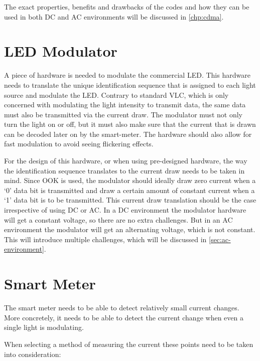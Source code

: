 	The exact properties, benefits and drawbacks of the codes and how they can be used in both DC and AC environments will be discussed in \autoref{chp:cdma}.




	\section{LED Modulator}

	A piece of hardware is needed to modulate the commercial LED.
	This hardware needs to translate the unique identification sequence that is assigned to each light source and modulate the LED.
	Contrary to standard VLC, which is only concerned with modulating the light intensity to transmit data, the same data must also be transmitted via the current draw.
	The modulator must not only turn the light on or off, but it must also make sure that the current that is drawn can be decoded later on by the smart-meter.
	The hardware should also allow for fast modulation to avoid seeing flickering effects.


	For the design of this hardware, or when using pre-designed hardware, the way the identification sequence translates to the current draw needs to be taken in mind.
	Since OOK is used, the modulator should ideally draw zero current when a `0' data bit is transmitted and draw a certain amount of constant current when a `1' data bit is to be transmitted.
	This current draw translation should be the case irrespective of using DC or AC.
	In a DC environment the modulator hardware will get a constant voltage, so there are no extra challenges.
	But in an AC environment the modulator will get an alternating voltage, which is not constant. 
	This will introduce multiple challenges, which will be discussed in \autoref{sec:ac-environment}.



	\section{Smart Meter}

	The smart meter needs to be able to detect relatively small current changes.
	More concretely, it needs to be able to detect the current change when even a single light is modulating.

	When selecting a method of measuring the current these points need to be taken into consideration:

